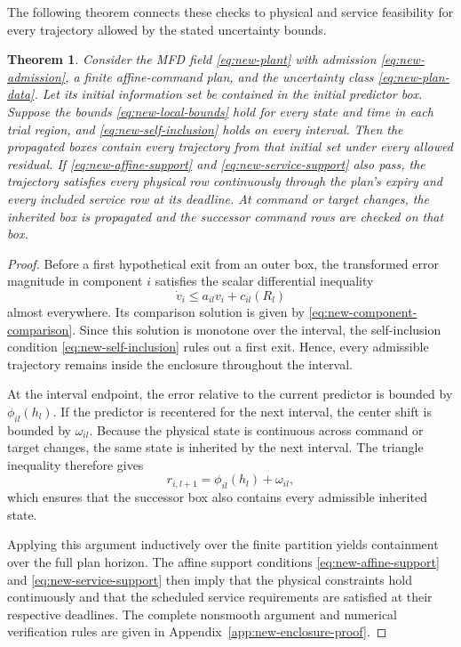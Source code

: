 \documentclass[journal,10pt]{IEEEtran}
\newtheorem{theorem}{Theorem}
\newcommand{\appref}[1]{Appendix~\ref{#1}}
\begin{document}
The following theorem connects these checks to physical and service feasibility for every trajectory allowed by the stated uncertainty bounds.

\begin{theorem}
\label{thm:new-plan-enclosure}
Consider the MFD field \eqref{eq:new-plant} with admission
\eqref{eq:new-admission}, a finite affine-command plan, and the uncertainty
class \eqref{eq:new-plan-data}. Let its initial information set be contained
in the initial predictor box. Suppose the bounds
\eqref{eq:new-local-bounds} hold for every state and time in each trial
region, and
\eqref{eq:new-self-inclusion} holds on every interval. Then the propagated
boxes contain every trajectory from that initial set under every allowed
residual. If \eqref{eq:new-affine-support} and
\eqref{eq:new-service-support} also pass, the trajectory satisfies every
physical row continuously through the plan's expiry and every included
service row at its deadline. At command or target changes, the inherited box
is propagated and the successor command rows are checked on that box.
\end{theorem}

\begin{proof}
Before a first hypothetical exit from an outer box, the transformed error
magnitude in component $i$ satisfies the scalar differential inequality
\[
\dot v_i\le a_{il}v_i+c_{il}(R_l)
\]
almost everywhere. Its comparison solution is given by
\eqref{eq:new-component-comparison}. Since this solution is monotone over the
interval, the self-inclusion condition
\eqref{eq:new-self-inclusion} rules out a first exit. Hence, every admissible
trajectory remains inside the enclosure throughout the interval.

At the interval endpoint, the error relative to the current predictor is
bounded by $\phi_{il}(h_l)$. If the predictor is recentered for the next
interval, the center shift is bounded by $\omega_{il}$. Because the physical
state is continuous across command or target changes, the same state is
inherited by the next interval. The triangle inequality therefore gives
\[
r_{i,l+1}=\phi_{il}(h_l)+\omega_{il},
\]
which ensures that the successor box also contains every admissible inherited
state.

Applying this argument inductively over the finite partition yields
containment over the full plan horizon. The affine support conditions
\eqref{eq:new-affine-support} and \eqref{eq:new-service-support} then imply
that the physical constraints hold continuously and that the scheduled
service requirements are satisfied at their respective deadlines. The
complete nonsmooth argument and numerical verification rules are given in
\appref{app:new-enclosure-proof}.
\end{proof}
\end{document}
